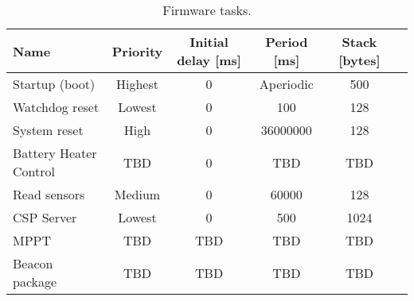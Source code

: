 \begin{table}[!h]
    \centering
    \begin{tabular}{lccccc}
        \toprule[1.5pt]
        \textbf{Name}          & \textbf{Priority} & \textbf{Initial delay [ms]} & \textbf{Period [ms]} & \textbf{Stack [bytes]} \\
        \midrule
        Startup (boot)         & Highest           & 0                           & Aperiodic            & 500                    \\
        Watchdog reset         & Lowest            & 0                           & 100                  & 128                    \\
        System reset           & High              & 0                           & 36000000             & 128                    \\
        Battery Heater Control & TBD               & 0                           & TBD                  & TBD                    \\
        Read sensors           & Medium            & 0                           & 60000                & 128                    \\
        CSP Server             & Lowest            & 0                           & 500                  & 1024                   \\
        MPPT                   & TBD               & TBD                         & TBD                  & TBD                    \\
        Beacon package         & TBD               & TBD                         & TBD                  & TBD                    \\
        \bottomrule[1.5pt]
    \end{tabular}
    \caption{Firmware tasks.}
    \label{tab:firmware-tasks}
\end{table}

